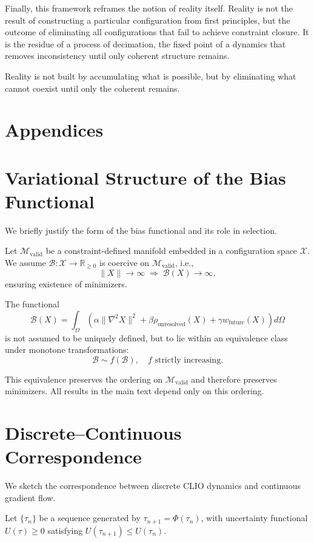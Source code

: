 \documentclass[11pt]{article}
\theoremstyle{plain}
\theoremstyle{definition}
\theoremstyle{remark}
\begin{document}
Finally, this framework reframes the notion of reality itself. Reality is not the result of constructing a particular configuration from first principles, but the outcome of eliminating all configurations that fail to achieve constraint closure. It is the residue of a process of decimation, the fixed point of a dynamics that removes inconsistency until only coherent structure remains.

Reality is not built by accumulating what is possible, but by eliminating what cannot coexist until only the coherent remains.

\newpage
\section*{Appendices}
\appendix

\section{Variational Structure of the Bias Functional}

We briefly justify the form of the bias functional and its role in selection.

Let $\mathcal{M}_{\mathrm{valid}}$ be a constraint-defined manifold embedded in a configuration space $\mathcal{X}$. We assume $\mathcal{B} : \mathcal{X} \to \mathbb{R}_{\geq 0}$ is coercive on $\mathcal{M}_{\mathrm{valid}}$, i.e.,
\[
\|X\| \to \infty \;\Rightarrow\; \mathcal{B}(X) \to \infty,
\]
ensuring existence of minimizers.

The functional
\[
\mathcal{B}(X) = \int_{\Omega} \left( \alpha \|\nabla^2 X\|^2 + \beta \rho_{\mathrm{unresolved}}(X) + \gamma w_{\mathrm{future}}(X) \right) d\Omega
\]
is not assumed to be uniquely defined, but to lie within an equivalence class under monotone transformations:
\[
\mathcal{B} \sim f(\mathcal{B}), \quad f \text{ strictly increasing}.
\]

This equivalence preserves the ordering on $\mathcal{M}_{\mathrm{valid}}$ and therefore preserves minimizers. All results in the main text depend only on this ordering.

\section{Discrete--Continuous Correspondence}

We sketch the correspondence between discrete CLIO dynamics and continuous gradient flow.

Let $\{\tau_n\}$ be a sequence generated by $\tau_{n+1} = \Phi(\tau_n)$, with uncertainty functional $U(\tau) \geq 0$ satisfying $U(\tau_{n+1}) \leq U(\tau_n)$.
\end{document}
